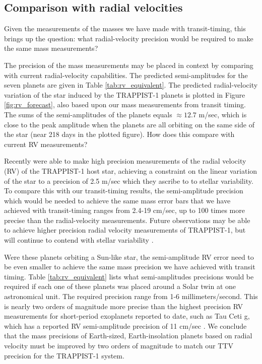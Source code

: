 \documentclass[twocolumn]{aastex63}
\begin{document}
\subsection{Comparison with radial velocities}

Given the measurements of the masses we have made with transit-timing,
this brings up the question:  what radial-velocity precision would be
required to make the same mass measurements?

The precision of the mass measurements may be placed in
context by comparing with current radial-velocity capabilities.
The predicted semi-amplitudes for the seven planets are given
in Table \ref{tab:rv_equivalent}.
The predicted radial-velocity variation of the star induced by the TRAPPIST-1
planets is plotted in Figure \ref{fig:rv_forecast}, also based upon our
mass measurements from transit timing.  The sums of the semi-amplitudes
of the planets equals $\approx 12.7$ m/sec, which is close to the
peak amplitude when the planets are all orbiting on the same side of
the star (near 218 days in the plotted figure).  How does this compare
with current RV measurements?

Recently \citet{Hirano2020} were able to make high precision
measurements of the radial velocity (RV) of the TRAPPIST-1 host star,
achieving a constraint on the linear variation of the star to
a precision of 2.5 m/sec which they ascribe to
to stellar variability.  To compare this with our
transit-timing results, the semi-amplitude precision
which would be needed to achieve the same mass error bars that
we have achieved with transit-timing ranges from 2.4-19 cm/sec,
up to 100 times more precise than the radial-velocity measurements.
Future observations may be able to achieve higher precision radial
velocity measurements of TRAPPIST-1, but will continue to contend with stellar
variability \citep{Klein2019}.

Were these planets orbiting a Sun-like star, the semi-amplitude RV error
need to be even smaller to achieve
the same mass precision we have achieved with transit timing.
Table \ref{tab:rv_equivalent} lists what semi-amplitudes precisions
would be required if each one of these planets was placed around a
Solar twin at one astronomical unit.  The required precision range
from 1-6 millimeters/second.  This is nearly two orders of magnitude
more precise than the highest precision RV measurements
for short-period exoplanets reported to date, such as Tau Ceti g,
which has a reported RV semi-amplitude precision of 11 cm/sec \citep{Feng2017}.
We conclude that the mass precisions of Earth-sized, Earth-insolation
planets based on radial velocity must be improved by two orders
of magnitude to match our TTV precision for the TRAPPIST-1 system.
\end{document}
